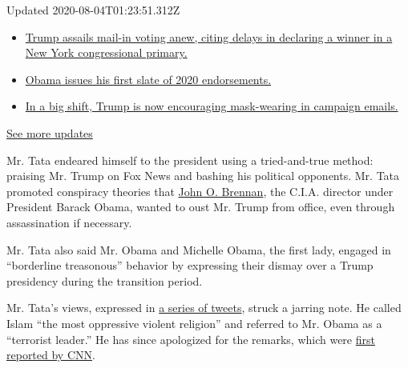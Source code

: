 Updated 2020-08-04T01:23:51.312Z

\begin{itemize}
\tightlist
\item
  \href{https://www.nytimes3xbfgragh.onion/2020/08/03/us/elections/biden-vs-trump.html?action=click\&pgtype=Article\&state=default\&region=MAIN_CONTENT_1\&context=storylines_live_updates\#link-6494b448}{Trump
  assails mail-in voting anew, citing delays in declaring a winner in a
  New York congressional primary.}
\item
  \href{https://www.nytimes3xbfgragh.onion/2020/08/03/us/elections/biden-vs-trump.html?action=click\&pgtype=Article\&state=default\&region=MAIN_CONTENT_1\&context=storylines_live_updates\#link-3de249e6}{Obama
  issues his first slate of 2020 endorsements.}
\item
  \href{https://www.nytimes3xbfgragh.onion/2020/08/03/us/elections/biden-vs-trump.html?action=click\&pgtype=Article\&state=default\&region=MAIN_CONTENT_1\&context=storylines_live_updates\#link-54e34d20}{In
  a big shift, Trump is now encouraging mask-wearing in campaign
  emails.}
\end{itemize}

\href{https://www.nytimes3xbfgragh.onion/2020/08/03/us/elections/biden-vs-trump.html?action=click\&pgtype=Article\&state=default\&region=MAIN_CONTENT_1\&context=storylines_live_updates}{See
more updates}

Mr. Tata endeared himself to the president using a tried-and-true
method: praising Mr. Trump on Fox News and bashing his political
opponents. Mr. Tata promoted conspiracy theories that
\href{https://www.nytimes3xbfgragh.onion/2018/06/27/magazine/john-brennan-president-trump-national-security-state.html}{John
O. Brennan}, the C.I.A. director under President Barack Obama, wanted to
oust Mr. Trump from office, even through assassination if necessary.

Mr. Tata also said Mr. Obama and Michelle Obama, the first lady, engaged
in ``borderline treasonous'' behavior by expressing their dismay over a
Trump presidency during the transition period.

Mr. Tata's views, expressed in
\href{https://twitter.com/ajtata/status/1014278134185840640}{a series of
tweets}, struck a jarring note. He called Islam ``the most oppressive
violent religion'' and referred to Mr. Obama as a ``terrorist leader.''
He has since apologized for the remarks, which were
\href{https://edition.cnn.com/2020/06/12/politics/pentagon-nominee-tata-trump-kfile/index.html}{first
reported by CNN}.

